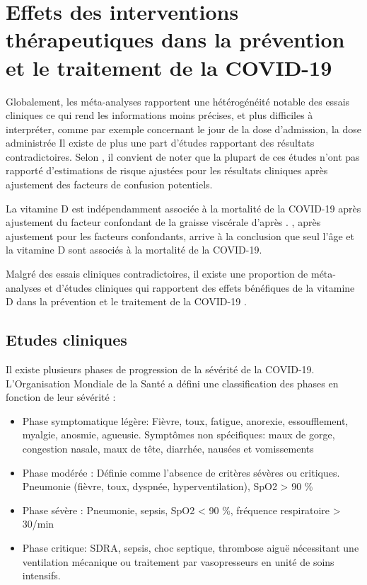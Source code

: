 \documentclass[
  a4paper,
  DIV=11,
  numbers=noendperiod,
  listof=totoc]{scrreprt}
\providecommand{\tightlist}{%
  \setlength{\itemsep}{0pt}\setlength{\parskip}{0pt}}\usepackage{longtable,booktabs,array}
\begin{document}
\section{Effets des interventions thérapeutiques dans la prévention et
le traitement de la
COVID-19}\label{effets-des-interventions-thuxe9rapeutiques-dans-la-pruxe9vention-et-le-traitement-de-la-covid-19}

Globalement, les méta-analyses rapportent une hétérogénéité notable des
essais cliniques ce qui rend les informations moins précises, et plus
difficiles à interpréter, comme par exemple concernant le jour de la
dose d'admission, la dose administrée Il existe de plus une part
d'études rapportant des résultats contradictoires. Selon
\textcite{Pal.2022}, il convient de noter que la plupart de ces études
n'ont pas rapporté d'estimations de risque ajustées pour les résultats
cliniques après ajustement des facteurs de confusion potentiels.

La vitamine D est indépendamment associée à la mortalité de la COVID-19
après ajustement du facteur confondant de la graisse viscérale d'après
\textcite{Vanegas-Cedillo.2022} . \textcite{Borsche.2021}, après
ajustement pour les facteurs confondants, arrive à la conclusion que
seul l'âge et la vitamine D sont associés à la mortalité de la COVID-19.

Malgré des essais cliniques contradictoires, il existe une proportion de
méta-analyses et d'études cliniques qui rapportent des effets bénéfiques
de la vitamine D dans la prévention et le traitement de la COVID-19
\autocite{Pal.2022}.

\subsection{Etudes cliniques}\label{etudes-cliniques}

Il existe plusieurs phases de progression de la sévérité de la COVID-19.
L'Organisation Mondiale de la Santé a défini une classification des
phases en fonction de leur sévérité \autocite{WHO.2023.org,Agarwal.2020}
:

\begin{itemize}
\tightlist
\item
  Phase symptomatique légère: Fièvre, toux, fatigue, anorexie,
  essoufflement, myalgie, anosmie, agueusie. Symptômes non spécifiques:
  maux de gorge, congestion nasale, maux de tête, diarrhée, nausées et
  vomissements
\item
  Phase modérée : Définie comme l'absence de critères sévères ou
  critiques. Pneumonie (fièvre, toux, dyspnée, hyperventilation),
  \ac{SpO2} \textgreater{} 90 \%
\item
  Phase sévère : Pneumonie, sepsis, \ac{SpO2} \textless{} 90 \%,
  fréquence respiratoire \textgreater{} 30/min
\item
  Phase critique: \ac{SDRA}, sepsis, choc septique, thrombose aiguë
  nécessitant une ventilation mécanique ou traitement par vasopresseurs
  en unité de soins intensifs.
\end{itemize}
\end{document}

